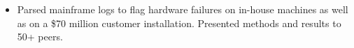 \documentclass[12pt,letterpaper]{article}
\newcommand{\CPP}{C\nolinebreak[4]\hspace{-.05em}\raisebox{.22ex}{\footnotesize\bf ++}\xspace}
\begin{document}
\begin{itemize}[leftmargin=\parindent]
\begin{itemize}[leftmargin=\parindent]

            \item Parsed mainframe logs to flag hardware failures on in-house machines as well as on a \$70 million customer installation. Presented methods and results to 50+ peers.















\end{itemize}
\end{itemize}
\end{document}
